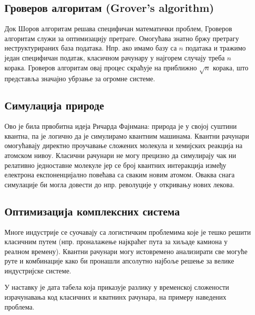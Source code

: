 \documentclass[12pt]{article}
\theoremstyle{plain}
\theoremstyle{definition}
\begin{document}
	\subsection{Гроверов алгоритам (Grover's algorithm)}
	Док Шоров алгоритам решава специфичан математички проблем, Гроверов алгоритам служи за оптимизацију претраге. Омогућава знатно бржу претрагу неструктурираних база података. Нпр. ако имамо базу са $n$ података и тражимо један специфичан податак, класичном рачунару у најгорем случају треба $n$ корака. Гроверов алгоритам овај процес скраћује на приближно $\sqrt{n}$ корака, што представља значајно убрзање за огромне системе.
	
	\subsection{Симулација природе}
	Ово је била првобитна идеја Ричарда Фајнмана: природа је у својој суштини квантна, па је логично да је симулирамо квантним машинама. Квантни рачунари омогућавају директно проучавање сложених молекула и хемијских реакција на атомском нивоу. Класични рачунари не могу прецизно да симулирају чак ни релативно једноставне молекуле јер се број квантних интеракција између електрона експоненцијално повећава са сваким новим атомом.
	Оваква снага симулације би могла довести до нпр. револуције у откривању нових лекова.
	
	\subsection{Оптимизација комплексних система}
	Многе индустрије се суочавају са логистичким проблемима које је тешко решити класичним путем (нпр. проналажење најкраћег пута за хиљаде камиона у реалном времену). Квантни рачунари могу истовремено анализирати све могуће руте и комбинације како би пронашли апсолутно најбоље решење за велике индустријске системе.
	
	У наставку је дата табела која приказује разлику у временској сложености израчунавања код класичних и кватнинх рачунара, на примеру наведених проблема.
	
\end{document}
